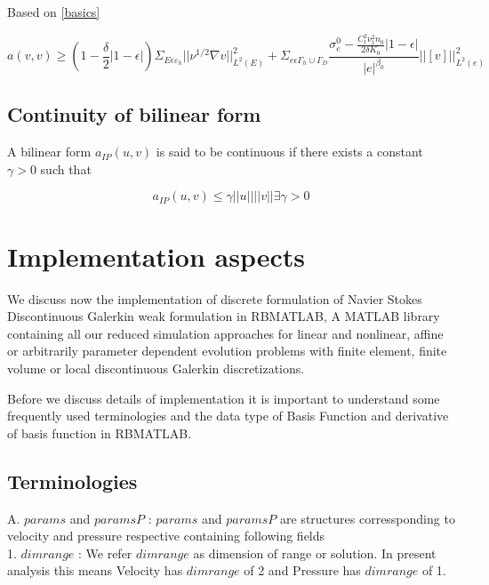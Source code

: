 \documentclass[a4paper,12pt]{book}
\begin{document}
Based on \ref{basics}

\begin{equation}\label{Coercivity_constant}
a(v,v) \geq (1-\frac{\delta}{2} |1-\epsilon|) \Sigma_{E \epsilon \varepsilon_h} ||\nu^{1/2} \nabla v ||^2_{L^2(E)} + \Sigma_{e \epsilon \Gamma_h \cup \Gamma_D} \frac{\sigma_e^0 - \frac{C_t^2 \nu_1^2 n_0}{2 \delta K_0}|1-\epsilon|}{|e|^{\beta_0}} ||[v]||^2_{L^2(e)}
\end{equation}

\section{Continuity of bilinear form}

A bilinear form $a_{IP}(u,v)$ is said to be continuous if there exists a constant $\gamma > 0$ such that

\begin{equation}\label{Continuity_constant}
a_{IP}(u,v) \leq \gamma ||u||||v||   \exists   \gamma > 0
\end{equation}

\chapter{Implementation aspects} \label{implementation_aspects}

We discuss now the implementation of discrete formulation of Navier Stokes Discontinuous Galerkin weak formulation in RBMATLAB, A MATLAB library containing all our reduced simulation approaches for linear and nonlinear, affine or arbitrarily parameter dependent evolution problems with finite element, finite volume or local discontinuous Galerkin discretizations. 

Before we discuss details of implementation it is important to understand some frequently used terminologies and the data type of Basis Function and derivative of basis function in RBMATLAB.

\section{Terminologies}


A. $params$ and $paramsP$ : $params$ and $paramsP$ are structures corressponding to velocity and pressure respective containing following fields\\

1. $dimrange$ : We refer $dimrange$ as dimension of range or solution. In present analysis this means Velocity has $dimrange$ of 2 and Pressure has $dimrange$ of 1.\\
\end{document}
